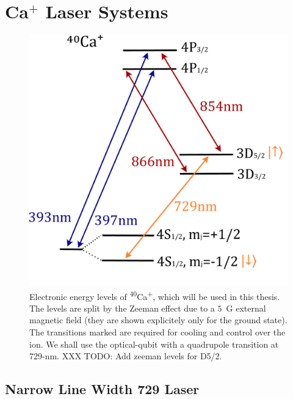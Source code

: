 \section{Ca$^+$ Laser Systems}	
\label{sec:Laser systems}
    \begin{figure}[ht]
        \begin{center}
        \noindent\includegraphics[width=0.4\linewidth]{figures/pdf_figure/Ca40.pdf}
        \end{center}
        \caption{
        Electronic energy levels of \textsuperscript{40}Ca\textsuperscript{+},
        which will be used in this thesis. The levels are
        split by the Zeeman effect due to a $5$~G external magnetic field (they are shown explicitely only for the ground state). The
        transitions marked are required for cooling and control over the
        ion. We shall use the optical-qubit with a quadrupole transition at
        729-nm. XXX TODO: Add zeeman levels for D5/2.
        }

    \label{fig:ion}
    \end{figure}

\subsection{Narrow Line Width 729 Laser}
\label{sec:Narrow Line Width 729 Laser} 

